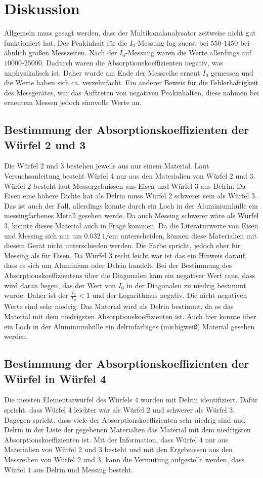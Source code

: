 \section{Diskussion}
\label{sec:Diskussion}
Allgemein muss gesagt werden, dass der Multikanalanalysator zeitweise nicht gut funktioniert hat. 
Der Peakinhalt für die $I_0$-Messung lag zuerst bei $\num{550}$-$\num{1450}$ bei ähnlich großen Messzeiten. Nach der $I_0$-Messung 
waren die Werte allerdings auf $\num{10000}$-$\num{25000}$. Dadurch waren die Absorptionskoeffizienten negativ, was unphysikalisch ist.
Daher wurde am Ende der Messreihe erneut $I_0$ gemessen und die Werte haben sich ca. verzehnfacht. Ein anderer Beweis für 
die Fehlerhaftigkeit des Messgerätes, war das Auftreten von negativen Peakinhalten, diese nahmen bei erneutem Messen jedoch 
sinnvolle Werte an.
\subsection{Bestimmung der Absorptionskoeffizienten der Würfel 2 und 3}
Die Würfel 2 und 3 bestehen jeweils aus nur einem Material. Laut Versuchsanleitung besteht Würfel 4 nur aus den 
Materialien von Würfel 2 und 3. Würfel 2 besteht laut Messergebnissen aus Eisen und Würfel 3 aus Delrin. Da Eisen eine 
höhere Dichte hat als Delrin muss Würfel 2 schwerer sein als Würfel 3. Das ist auch der Fall, allerdings konnte durch 
ein Loch in der Aluminiumhülle ein messingfarbenes Metall gesehen werde. Da auch Messing schwerer wäre als Würfel 
3, könnte dieses Material auch in Frage kommen. Da die Literaturwerte von Eisen und Messing sich nur um $\SI{0.032}{1\per\centi\meter}$
unterscheiden, können diese Materialien mit diesem Gerät nicht unterschieden werden. Die Farbe spricht, jedoch eher für Messing als für Eisen.
Da Würfel 3 recht leicht war ist das ein Hinweis darauf, dass es sich um Aluminium oder Delrin handelt. 
Bei der Bestimmung des Absorptionskoeffizientens über die Diagonalen kam ein negativer Wert raus, dass 
wird daran liegen, das der Wert von $I_0$ in der Diagonalen zu niedrig bestimmt wurde. Daher ist der $\frac{I_0}{I_{D}}<1$ und 
der Logarithmus negativ. Die nicht negativen Werte sind sehr niedrig. Das Material wird als Delrin bestimmt, da es das Material
mit dem niedrigsten Absorptionskoeffizienten ist. Auch hier konnte über ein Loch in der Aluminiumhülle 
ein delrinfarbiges (michigweiß) Material gesehen werden.
\subsection{Bestimmung der Absorptionskoeffizienten der Würfel in Würfel 4}
Die meisten Elementarwürfel des Würfels 4 wurden mit Delrin identifiziert. Dafür spricht, dass Würfel 4 leichter war 
als Würfel 2 und schwerer als Würfel 3. Dagegen spricht, dass viele der Absorptionskoeffizienten sehr niedrig sind und 
Delrin in der Liste der gegebenen Materialien das Material mit dem niedrigsten Absorptionskoeffizienten ist.
Mit der Information, dass Würfel 4 nur aus Materialien von Würfel 2 und 3 besteht und mit den Ergebnissen aus den Messreihen
von Würfel 2 und 3, kann die Vermutung aufgestellt werden, dass Würfel 4 aus Delrin und Messing besteht. 